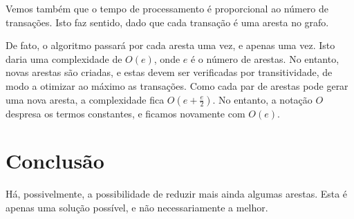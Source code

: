 \documentclass[12pt]{article}
\begin{document}
Vemos também que o tempo de processamento é proporcional ao número de
transações. Isto faz sentido, dado que cada transação é uma aresta no grafo.

De fato, o algoritmo passará por cada aresta uma vez, e apenas uma vez. Isto
daria uma complexidade de $O(e)$, onde $e$ é o número de arestas. No entanto,
novas arestas são criadas, e estas devem ser verificadas por transitividade, de
modo a otimizar ao máximo as transações. Como cada par de arestas pode gerar uma
nova aresta, a complexidade fica $O(e + \frac{e}{2})$. No entanto, a notação $O$
despresa os termos constantes, e ficamos novamente com $O(e)$.

\section{Conclusão}\label{sec:conclusao}

Há, possivelmente, a possibilidade de reduzir mais ainda algumas arestas. Esta é
apenas uma solução possível, e não necessariamente a melhor.
\end{document}
